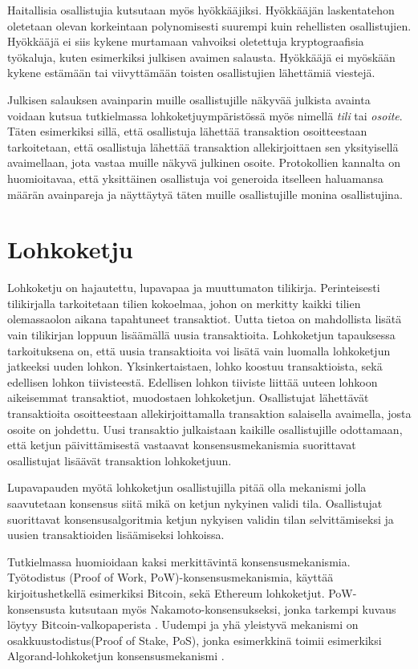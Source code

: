 Haitallisia osallistujia kutsutaan myös hyökkääjiksi. Hyökkääjän laskentatehon oletetaan olevan korkeintaan polynomisesti suurempi kuin rehellisten osallistujien. Hyökkääjä ei siis kykene murtamaan vahvoiksi oletettuja kryptograafisia työkaluja, kuten esimerkiksi julkisen avaimen salausta. Hyökkääjä ei myöskään kykene estämään tai viivyttämään toisten osallistujien lähettämiä viestejä.

Julkisen salauksen avainparin muille osallistujille näkyvää julkista avainta voidaan kutsua tutkielmassa lohkoketjuympäristössä myös nimellä \textit{tili} tai \textit{osoite}. Täten esimerkiksi sillä, että osallistuja lähettää transaktion osoitteestaan tarkoitetaan, että osallistuja lähettää transaktion allekirjoittaen sen yksityisellä avaimellaan, jota vastaa muille näkyvä julkinen osoite. Protokollien kannalta on huomioitavaa, että yksittäinen osallistuja voi generoida itselleen haluamansa määrän avainpareja ja näyttäytyä täten muille osallistujille monina osallistujina.

\section{Lohkoketju}

Lohkoketju on hajautettu, lupavapaa ja muuttumaton tilikirja. Perinteisesti tilikirjalla tarkoitetaan tilien kokoelmaa, johon on merkitty kaikki tilien olemassaolon aikana tapahtuneet transaktiot. Uutta tietoa on mahdollista lisätä vain tilikirjan loppuun lisäämällä uusia transaktioita. Lohkoketjun tapauksessa tarkoituksena on, että uusia  transaktioita voi lisätä vain luomalla lohkoketjun jatkeeksi uuden lohkon. Yksinkertaistaen, lohko koostuu transaktioista, sekä edellisen lohkon tiivisteestä. Edellisen lohkon tiiviste liittää uuteen lohkoon aikeisemmat transaktiot, muodostaen lohkoketjun. Osallistujat lähettävät transaktioita osoitteestaan allekirjoittamalla transaktion salaisella avaimella, josta osoite on johdettu. Uusi transaktio julkaistaan kaikille osallistujille odottamaan, että ketjun päivittämisestä vastaavat konsensusmekanismia suorittavat osallistujat lisäävät transaktion lohkoketjuun.

 Lupavapauden myötä lohkoketjun osallistujilla pitää olla mekanismi jolla saavutetaan konsensus siitä mikä on ketjun nykyinen validi tila. Osallistujat suorittavat konsensusalgoritmia ketjun nykyisen validin tilan selvittämiseksi ja uusien transaktioiden lisäämiseksi lohkoissa. 

Tutkielmassa huomioidaan kaksi merkittävintä konsensusmekanismia. Työtodistus (Proof of Work, PoW)-konsensusmekanismia, käyttää kirjoitushetkellä esimerkiksi Bitcoin, sekä Ethereum lohkoketjut. PoW-konsensusta kutsutaan myös Nakamoto-konsensukseksi, jonka tarkempi kuvaus löytyy Bitcoin-valkopaperista \cite{Nakamoto_bitcoin}. Uudempi ja yhä yleistyvä mekanismi on  osakkuustodistus(Proof of Stake, PoS), jonka esimerkkinä toimii esimerkiksi Algorand-lohkoketjun konsensusmekanismi \cite{gilad_algorand_2017}. 

